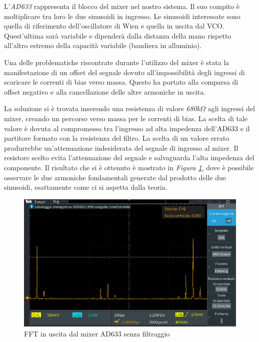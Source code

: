 \documentclass[titlepage]{report}
\begin{document}
	L'\textit{AD633} rappresenta il blocco del mixer nel nostro sistema. Il suo compito è moltiplicare tra loro le due sinusoidi in ingresso. Le sinusoidi interessate sono quella di riferimento dell'oscillatore di Wien e quella in uscita dal VCO. Quest'ultima sarà variabile e dipenderà dalla distanza della mano rispetto all'altro estremo della capacità variabile (bandiera in alluminio).


	Una delle problematiche riscontrate durante l'utilizzo del mixer è stata la manifestazione di un offset del segnale dovuto all'impossibilità degli ingressi di scaricare le correnti di bias verso massa. Questo ha portato alla comparsa di offset negativo e alla cancellazione delle altre armoniche in uscita.

	La soluzione si è trovata inserendo una resistenza di valore \textit{680k$\Omega$} agli ingressi del mixer, creando un percorso verso massa per le correnti di bias. La scelta di tale valore è dovuta al compromesso tra l'ingresso ad alta impedenza dell'AD633 e il partitore formato con la resistenza del filtro. La scelta di un valore errato produrrebbe un'attenuazione indesiderata del segnale di ingresso al mixer. Il resistore scelto evita l'attenuazione del segnale e salvaguarda l'alta impedenza del componente. Il risultato che si è ottenuto è mostrato in \textit{Figura \ref{fig:FFTAD633}}, dove è possibile osservare le due armoniche fondamentali generate dal prodotto delle due sinusoidi, esattamente come ci si aspetta dalla teoria.

	\begin{figure}[H]
		\centering
		\includegraphics[scale = 0.5]{Immagini/ad633_fft_mixed.PNG}
		\caption{FFT in uscita dal mixer AD633 senza filtraggio}
		\label{fig:FFTAD633}
	\end{figure}
\end{document}
